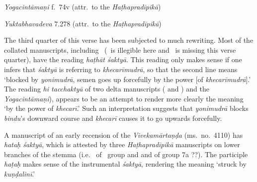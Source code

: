 \begin{ekdosis}
\begin{testimonia}[hp03_040]
\emph{Yogacintāmaṇi} f.~74v (attr.~to the \emph{Haṭhapradīpikā})
\begin{versinnote}
\end{versinnote}

\emph{Yuktabhavadeva} 7.278 (attr.~to the \emph{Haṭhapradīpikā})
\begin{versinnote}
\end{versinnote}
\end{testimonia}

\begin{philcomm}[hp03_040]

The third quarter of this verse has been subjected to much rewriting. Most of the collated manuscripts, including \alphaTwo\ (\alphaOne\ is illegible here and \alphaThree\ is missing this verse quarter), have the reading \emph{haṭhāt śaktyā}. This reading only makes sense if one infers that \emph{śaktyā} is referring to \emph{khecarīmudrā}, so that the second line means `blocked by \emph{yonimudrā}, semen goes up forcefully by the power [of \emph{khecarīmudrā}].' The reading \emph{hi tacchaktyā} of two delta manuscripts ( and ) and the \emph{Yogacintāmaṇi}), appears to be an attempt to render more clearly the meaning `by the power of \emph{khecarī}.' Such an interpretation suggests that \emph{yonimudrā} blocks \emph{bindu}'s downward course and \emph{khecarī} causes it to go upwards forcefully.

A manuscript of an early recension of the \emph{Vivekamārtaṇḍa} (ms.~no.~4110) has \emph{hataḥ śaktyā}, which is attested by three \emph{Haṭhapradīpikā} manuscripts on lower branches of the stemma (i.e.~ of \textdelta\ group and  and  of group 7a ??). The participle \emph{haṭaḥ} makes sense of the instrumental \emph{śaktyā}, rendering the meaning `struck by \emph{kuṇḍalinī}.' 


\end{philcomm}
\end{ekdosis}
